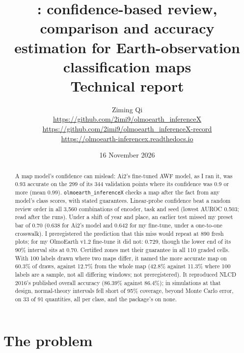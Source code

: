 \documentclass[11pt,a4paper]{article}
\title{\pkg: confidence-based review, comparison and accuracy estimation for Earth-observation classification maps\\[6pt]
\large Technical report}
\author{Ziming Qi\\[2pt] \small \url{https://github.com/2imi9/olmoearth_inferenceX}\\[-1pt]
\small \url{https://github.com/2imi9/olmoearth_inferenceX-record}\\[-1pt]
\small \url{https://olmoearth-inferencex.readthedocs.io}}
\date{16 November 2026}
\newcommand{\pkg}{\texttt{olmoearth\_inferenceX}}
\begin{document}
\maketitle

\begin{abstract}
A map model's confidence can mislead: Ai2's
fine-tuned AWF model, as I ran it, was 0.93 accurate on the 299 of its 344 validation points where its confidence was
0.9 or more (mean 0.99). \pkg{} checks a map after the fact from any model's class scores, with stated
guarantees. Linear-probe confidence beat a random review order in all 3,560 combinations of encoder, task and
seed (lowest AUROC 0.503; read after the runs). Under a shift of year and place, an earlier test missed my preset bar
of 0.70 (0.638 for Ai2's model and 0.642 for my fine-tune, under a one-to-one crosswalk). I preregistered
the prediction that this miss would repeat at 890 fresh plots; for my OlmoEarth v1.2 fine-tune it did not: 0.729,
though the lower end of its 90\% interval sits at 0.70. Certified zones met their guarantee in all 110 graded
cells. With 100 labels drawn where two maps differ, it named the more accurate map on 60.3\% of draws, against
12.7\% from the whole map (42.8\% against 11.3\% where 100 labels are a sample, not all differing windows; not
preregistered). It
reproduced NLCD 2016's published overall accuracy (86.39\% against 86.4\%); in simulations at that design,
normal-theory intervals fell short of 95\% coverage, beyond Monte Carlo error, on 33 of 91 quantities, all per class,
and the package's on none.
\end{abstract}

\section{The problem}
\label{sec:intro}
\end{document}
